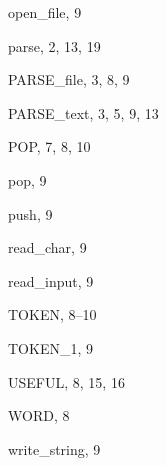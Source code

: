 \begin{theindex}
  \indexspace

  \item {\ptt open\_file}, 9

  \indexspace

  \item {\ptt parse}, 2, 13, 19
  \item {\ptt PARSE\_file}, 3, 8, 9
  \item {\ptt PARSE\_text}, 3, 5, 9, 13
  \item {\ptt POP}, 7, 8, 10
  \item {\ptt pop}, 9
  \item {\ptt push}, 9

  \indexspace

  \item {\ptt read\_char}, 9
  \item {\ptt read\_input}, 9

  \indexspace

  \item {\ptt TOKEN}, 8--10
  \item {\ptt TOKEN\_1}, 9

  \indexspace

  \item {\ptt USEFUL}, 8, 15, 16

  \indexspace

  \item {\ptt WORD}, 8
  \item {\ptt write\_string}, 9

\end{theindex}
